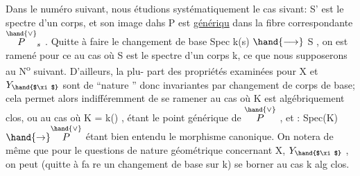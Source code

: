 Dans le numéro suivant, nous étudions systématiquement le cas
sivant: S' est le spectre d'un corps, et son image dahs P est \uline{génériqu}
dans la fibre correspondante $\overset{\hand{\vee}}{P}_s$ . Quitte à faire le changement de base
Spec k(s) $\hand{\longrightarrow}$ S , on est ramené pour ce au cas où S est le spectre
d'un corps k, ce que nous supposerons au N\textsuperscript{o} suivant. D'ailleurs, la plu-%
part des propriétés examinées pour X et $Y_{\hand{$\xi$}}$ sont de ``nature ''
donc invariantes par changement de corps de base; cela permet alors
indifféremment de se ramener au cas où K est algébriquement clos, ou au
cas où K = k(\hand{$\eta$}) , \hand{$\eta$} étant le point générique de $\overset{\hand{\vee}}{P}$ , et \hand{$\xi$} : Spec(K)$\hand{\to}\overset{\hand{\vee}}{P}$
étant bien entendu le morphisme canonique. On notera de même que pour le
questions de nature géométrique concernant X, $Y_{\hand{$\xi$}}$ , on peut (quitte à fa
re un changement de base sur k) se borner au cas k alg clos.


